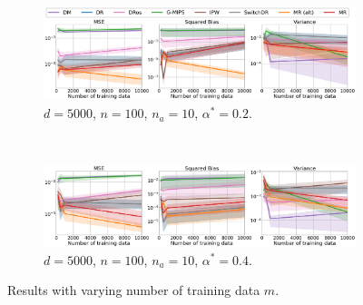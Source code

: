 \begin{figure}[ht]
     \centering
    \begin{subfigure}[b]{0.8\textwidth}
         \centering
         \includegraphics[width=\textwidth]{figures/mr/all_baselines/ope_vs_ntr_dimc_5000_alphatar_0_2_nac_10_neval_100.png}
         \caption{$d=5000$, $n = 100$, $n_a = 10$, $\alpha^\ast = 0.2$.}
         \label{fig:mse-vs-ntr-conf2a}
     \end{subfigure}\\
     \begin{subfigure}[b]{0.8\textwidth}
         \centering
         \includegraphics[width=\textwidth]{figures/mr/all_baselines/ope_vs_ntr_dimc_5000_alphatar_0_4_nac_10_neval_100.png}
         \caption{$d=5000$, $n = 100$, $n_a = 10$, $\alpha^\ast = 0.4$.}
         \label{fig:mse-vs-ntr-conf2b}
     \end{subfigure}
     \caption{Results with varying number of training data $m$.}
     \label{fig:mse-vs-ntr-conf2}
 \end{figure}


